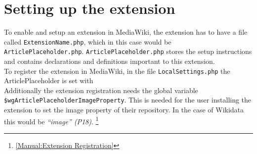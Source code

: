 \section{Setting up the extension}
	To enable and setup an extension in MediaWiki, the extension has to have a file called \texttt{ExtensionName.php}, which in this case would be \texttt{ArticlePlaceholder.php}. \texttt{ArticlePlaceholder.php} stores the setup instructions and contains declarations and definitions important to this extension. \\
	To register the extension in MediaWiki, in the file \texttt{LocalSettings.php} the ArticlePlaceholder is set with  \\
	Additionally the extension registration needs the global variable \texttt{\$wgArticlePlaceholderImageProperty}. This is needed for the user installing the extension to set the image property of their repository. In the case of Wikidata this would be \textit{``image'' (P18)}. \footnote{\href{https://www.mediawiki.org/wiki/Manual:Extension_registration}{[Manual:Extension Registration]}}